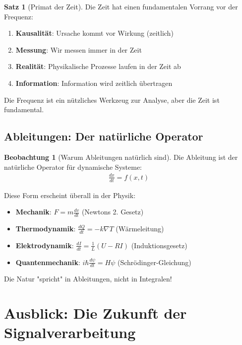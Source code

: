 ﻿\documentclass[a4paper,12pt]{report}
\theoremstyle{definition}
\newtheorem{satz}{Satz}
\newtheorem{beobachtung}{Beobachtung}
\begin{document}
	\begin{satz}[Primat der Zeit]
		Die Zeit hat einen fundamentalen Vorrang vor der Frequenz:
		
		\begin{enumerate}
			\item[-] \textbf{Kausalität}: Ursache kommt vor Wirkung (zeitlich)
			\item[-] \textbf{Messung}: Wir messen immer in der Zeit
			\item[-] \textbf{Realität}: Physikalische Prozesse laufen in der Zeit ab
			\item[-] \textbf{Information}: Information wird zeitlich übertragen
		\end{enumerate}
		
		Die Frequenz ist ein nützliches Werkzeug zur Analyse, aber die Zeit ist fundamental.
	\end{satz}
	
	\subsection{Ableitungen: Der natürliche Operator}
	
	\begin{beobachtung}[Warum Ableitungen natürlich sind]
		Die Ableitung ist der natürliche Operator für dynamische Systeme:
		\begin{align}
			\frac{dx}{dt} = f(x, t)
		\end{align}
		
		Diese Form erscheint überall in der Physik:
		\begin{itemize}
			\item[-] \textbf{Mechanik}: $F = m \frac{dv}{dt}$ (Newtons 2. Gesetz)
			\item[-] \textbf{Thermodynamik}: $\frac{dQ}{dt} = -k \nabla T$ (Wärmeleitung)
			\item[-] \textbf{Elektrodynamik}: $\frac{dI}{dt} = \frac{1}{L}(U - RI)$ (Induktionsgesetz)
			\item[-] \textbf{Quantenmechanik}: $i\hbar \frac{d\psi}{dt} = H\psi$ (Schrödinger-Gleichung)
		\end{itemize}
		
		Die Natur "spricht" in Ableitungen, nicht in Integralen!
	\end{beobachtung}
	
	\section{Ausblick: Die Zukunft der Signalverarbeitung}
	
\end{document}
